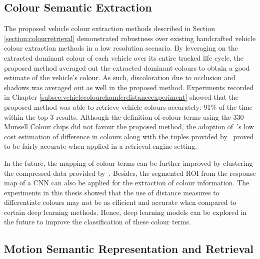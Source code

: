 \subsection*{Colour Semantic Extraction}
The proposed vehicle colour extraction methods described in Section \ref{section:colourretrieval}  demonstrated robustness over existing handcrafted vehicle colour extraction methods in a low resolution scenario.
By leveraging on the extracted dominant colour of each vehicle over its entire tracked life cycle, the proposed method averaged out the extracted dominant colours to obtain a good estimate of the vehicle's colour.
As such, discoloration due to occlusion and shadows was averaged out as well in the proposed method. Experiments recorded in Chapter \ref{subsec:vehiclecolourchamferdistanceexperiment} showed that the proposed method was able to retrieve vehicle colours accurately: 91\% of the time within the top 3 results.   %
Although the definition of colour terms using the 330 Munsell Colour chips did not favour the proposed method, the adoption of~'s low cost estimation of difference in colours %
along with the tuples provided by~ proved to be fairly accurate when applied in a retrieval engine setting.     

In the future, the mapping of colour terms can be further improved by clustering the compressed data provided by~. Besides, the segmented ROI from the response map of a CNN can also be applied for the extraction of colour information. The experiments in this thesis showed that the use of distance measures to differentiate colours may not be as efficient and accurate when compared to certain deep learning methods. Hence, deep learning models can be explored in the future to improve the classification of these colour terms.

\vspace{1em}
\subsection*{Motion Semantic Representation and Retrieval}

